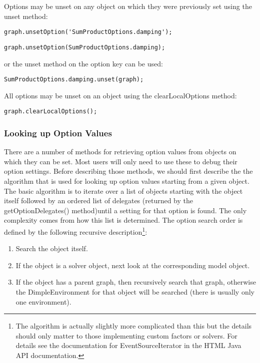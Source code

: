 Options may be unset on any object on which they were previously set using the unset method:

\ifmatlab
\begin{lstlisting}
graph.unsetOption('SumProductOptions.damping');
\end{lstlisting}
\fi

\ifjava
\begin{lstlisting}
graph.unsetOption(SumProductOptions.damping);
\end{lstlisting}

or the unset method on the option key can be used:

\begin{lstlisting}
SumProductOptions.damping.unset(graph);
\end{lstlisting}
\fi

All options may be unset on an object using the clearLocalOptions method:

\begin{lstlisting}
graph.clearLocalOptions();
\end{lstlisting}

\subsubsection{Looking up Option Values}

There are a number of methods for retrieving option values from objects on which they can be set. Most users will only need to use these to debug their option settings. Before describing those methods, we should first describe the the algorithm that is used for looking up option values starting from a given object. The basic algorithm is to iterate over a list of objects starting with the object itself followed by an ordered list of delegates \ifjava (returned by the getOptionDelegates() method)\fi until a setting for that option is found. The only complexity comes from how this list is determined. The option search order is defined by the following recursive description\footnote{The algorithm is actually slightly more complicated than this but the details should only matter to those implementing custom factors or solvers. For details see the documentation for EventSourceIterator in the HTML Java API documentation.}:

\begin{enumerate}
\item Search the object itself.
\item If the object is a solver object, next look at the corresponding model object.
\item If the object has a parent graph, then recursively search that graph,
otherwise the DimpleEnvironment for that object will be searched (there is usually only one environment).
\end{enumerate}

